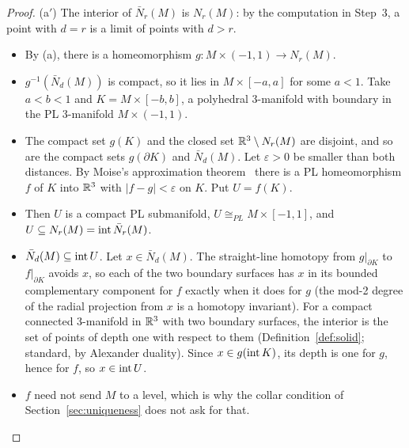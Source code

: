 \begin{proof}
(a$'$) The interior of $\bar N_r(M)$ is $N_r(M)$: by the computation in Step~3, a point with $d=r$ is a limit of
points with $d>r$.
\begin{itemize}
\item By (a), there is a homeomorphism $g\colon M\times(-1,1)\to N_r(M)$.
\item $g^{-1}(\bar N_d(M))$ is compact, so it lies in $M\times[-a,a]$ for some $a<1$. Take $a<b<1$ and
$K=M\times[-b,b]$, a polyhedral 3-manifold with boundary in the PL 3-manifold $M\times(-1,1)$.
\item The compact set $g(K)$ and the closed set $\mathbb{R}^3\setminus N_r(M)$ are disjoint, and so are the compact sets $g(\partial K)$ and $\bar N_d(M)$. Let
$\varepsilon>0$ be smaller than both distances. By Moise's approximation theorem~\cite[Thm.~35.2]{Moise77} there is a
PL homeomorphism $f$ of $K$ into $\mathbb{R}^3$ with $|f-g|<\varepsilon$ on $K$. Put $U=f(K)$.
\item Then $U$ is a compact PL submanifold, $U\cong_{PL}M\times[-1,1]$, and $U\subseteq N_r(M)=\operatorname{int}\bar N_r(M)$.
\item $\bar N_d(M)\subseteq\operatorname{int} U$. Let $x\in\bar N_d(M)$. The straight-line homotopy from $g|_{\partial K}$ to
$f|_{\partial K}$ avoids $x$, so each of the two boundary surfaces has $x$ in its bounded complementary component for $f$
exactly when it does for $g$ (the mod-2 degree of the radial projection from $x$ is a homotopy invariant). For a compact
connected 3-manifold in $\mathbb{R}^3$ with two boundary surfaces, the interior is the set of points of depth one with respect to
them (Definition~\ref{def:solid}; standard, by Alexander duality). Since $x\in g(\operatorname{int} K)$, its depth is one for $g$,
hence for $f$, so $x\in\operatorname{int} U$.
\item $f$ need not send $M$ to a level, which is why the collar condition of Section~\ref{sec:uniqueness} does not ask
for that.
\end{itemize}


\end{proof}
